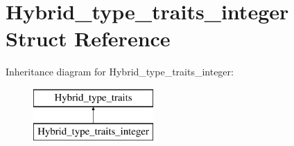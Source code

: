 \hypertarget{structHybrid__type__traits__integer}{}\section{Hybrid\+\_\+type\+\_\+traits\+\_\+integer Struct Reference}
\label{structHybrid__type__traits__integer}
Inheritance diagram for Hybrid\+\_\+type\+\_\+traits\+\_\+integer\+:\begin{figure}[H]
\begin{center}
\leavevmode
\includegraphics[height=2.000000cm]{structHybrid__type__traits__integer}
\end{center}
\end{figure}
